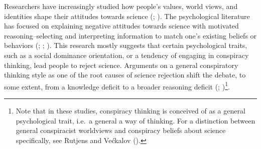 \documentclass[
  jou,
  floatsintext,
  longtable,
  nolmodern,
  notxfonts,
  notimes,
  colorlinks=true,linkcolor=blue,citecolor=blue,urlcolor=blue]{apa7}
\begin{document}
Researchers have increasingly studied how people's values, world views,
and identities shape their attitudes towards science
(;
). The psychological literature has focused on
explaining negative attitudes towards science with motivated
reasoning--selecting and interpreting information to match one's
existing beliefs or behaviors
(;
;
). This research mostly suggests that certain
psychological traits, such as a social dominance orientation, or a
tendency of engaging in conspiracy thinking, lead people to reject
science. Arguments on a general conspiratory thinking style as one of
the root causes of science rejection shift the debate, to some extent,
from a knowledge deficit to a broader reasoning deficit
(;
)\footnote{Note that in these studies, conspiracy thinking is
  conceived of as a general psychological trait, i.e.~a general a way of
  thinking. For a distinction between general conspiracist worldviews
  and conspiracy beliefs about science specifically, see Rutjens and
  Većkalov ().}.
\end{document}
